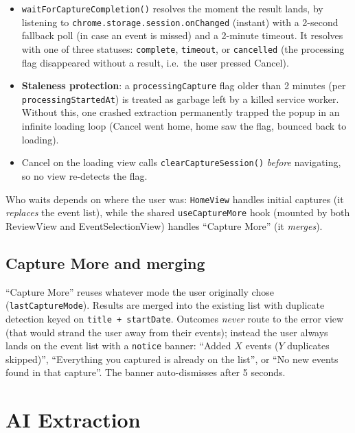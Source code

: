 \documentclass[11pt]{article}
\begin{document}
\begin{itemize}
  \item \texttt{waitForCaptureCompletion()} resolves the moment the result
        lands, by listening to \texttt{chrome.storage.session.onChanged}
        (instant) with a 2-second fallback poll (in case an event is missed)
        and a 2-minute timeout. It resolves with one of three statuses:
        \texttt{complete}, \texttt{timeout}, or \texttt{cancelled} (the
        processing flag disappeared without a result, i.e.\ the user pressed
        Cancel).
  \item \textbf{Staleness protection}: a \texttt{processingCapture} flag older
        than 2 minutes (per \texttt{processingStartedAt}) is treated as
        garbage left by a killed service worker. Without this, one crashed
        extraction permanently trapped the popup in an infinite loading loop
        (Cancel went home, home saw the flag, bounced back to loading).
  \item Cancel on the loading view calls \texttt{clearCaptureSession()}
        \emph{before} navigating, so no view re-detects the flag.
\end{itemize}

Who waits depends on where the user was: \texttt{HomeView} handles initial
captures (it \emph{replaces} the event list), while the shared
\texttt{useCaptureMore} hook (mounted by both ReviewView and
EventSelectionView) handles ``Capture More'' (it \emph{merges}).

\subsection{Capture More and merging}

``Capture More'' reuses whatever mode the user originally chose
(\texttt{lastCaptureMode}). Results are merged into the existing list with
duplicate detection keyed on \texttt{title + startDate}. Outcomes
\emph{never} route to the error view (that would strand the user away from
their events); instead the user always lands on the event list with a
\texttt{notice} banner: ``Added $X$ events ($Y$ duplicates skipped)'',
``Everything you captured is already on the list'', or ``No new events found
in that capture''. The banner auto-dismisses after 5 seconds.

\section{AI Extraction}
\end{document}
